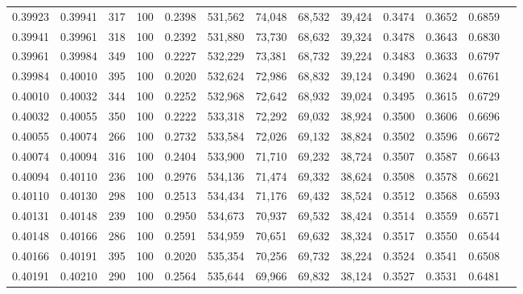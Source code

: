 \begin{tabular}{rrrrrrrrrrrrr}
0.39923 & 0.39941 &   317 & 100 &                                     0.2398 & 531,562 &  74,048 &  68,532 &  39,424 & 0.3474 & 0.3652 & 0.6859 \\
0.39941 & 0.39961 &   318 & 100 &                                     0.2392 & 531,880 &  73,730 &  68,632 &  39,324 & 0.3478 & 0.3643 & 0.6830 \\
0.39961 & 0.39984 &   349 & 100 &                                     0.2227 & 532,229 &  73,381 &  68,732 &  39,224 & 0.3483 & 0.3633 & 0.6797 \\
0.39984 & 0.40010 &   395 & 100 &                                     0.2020 & 532,624 &  72,986 &  68,832 &  39,124 & 0.3490 & 0.3624 & 0.6761 \\
0.40010 & 0.40032 &   344 & 100 &                                     0.2252 & 532,968 &  72,642 &  68,932 &  39,024 & 0.3495 & 0.3615 & 0.6729 \\
0.40032 & 0.40055 &   350 & 100 &                                     0.2222 & 533,318 &  72,292 &  69,032 &  38,924 & 0.3500 & 0.3606 & 0.6696 \\
0.40055 & 0.40074 &   266 & 100 &                                     0.2732 & 533,584 &  72,026 &  69,132 &  38,824 & 0.3502 & 0.3596 & 0.6672 \\
0.40074 & 0.40094 &   316 & 100 &                                     0.2404 & 533,900 &  71,710 &  69,232 &  38,724 & 0.3507 & 0.3587 & 0.6643 \\
0.40094 & 0.40110 &   236 & 100 &                                     0.2976 & 534,136 &  71,474 &  69,332 &  38,624 & 0.3508 & 0.3578 & 0.6621 \\
0.40110 & 0.40130 &   298 & 100 &                                     0.2513 & 534,434 &  71,176 &  69,432 &  38,524 & 0.3512 & 0.3568 & 0.6593 \\
0.40131 & 0.40148 &   239 & 100 &                                     0.2950 & 534,673 &  70,937 &  69,532 &  38,424 & 0.3514 & 0.3559 & 0.6571 \\
0.40148 & 0.40166 &   286 & 100 &                                     0.2591 & 534,959 &  70,651 &  69,632 &  38,324 & 0.3517 & 0.3550 & 0.6544 \\
0.40166 & 0.40191 &   395 & 100 &                                     0.2020 & 535,354 &  70,256 &  69,732 &  38,224 & 0.3524 & 0.3541 & 0.6508 \\
0.40191 & 0.40210 &   290 & 100 &                                     0.2564 & 535,644 &  69,966 &  69,832 &  38,124 & 0.3527 & 0.3531 & 0.6481 \\

\end{tabular}
